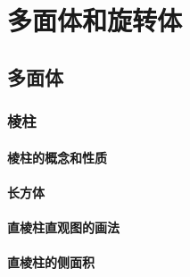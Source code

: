\chapter{多面体和旋转体}
\section{多面体}
\subsection{棱柱}
\subsubsection{棱柱的概念和性质}
\begin{Practice}
  \begin{question}
    \item 
    \item 
    \item 
  \end{question}
\end{Practice}
\subsubsection{长方体}
\begin{Practice}
  \begin{question}
    \item 
    \item 
    \item 
  \end{question}
\end{Practice}
\subsubsection{直棱柱直观图的画法}
\subsubsection{直棱柱的侧面积}
\begin{Practice}
  \begin{question}
    \item 
    \item 
  \end{question}
\end{Practice}
\begin{Exercise}
  \begin{question}
    \item 
    \item 
    \item 
    \item 
    \item 
    \item 
    \item 
    \item 
    \item 
    \item 
    \item 
    \item 
    \item 
  \end{question}
\end{Exercise}


